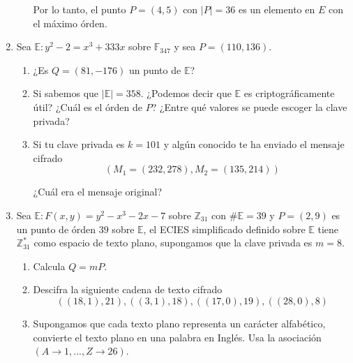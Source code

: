 \documentclass[letterpaper,11pt]{article}
\begin{document}
\begin{enumerate}
\begin{enumerate}
        Por lo tanto, el punto $P = (4, 5)$ con $|P| = 36$ es un
        elemento en $E$ con el máximo órden.
    \end{enumerate}

    \item Sea $\mathbb{E} : y^2 - 2 = x^3 + 333x$ sobre $\mathbb{F}_{347}$ y 
    sea $P = (110, 136)$. 
    \begin{enumerate}
        \item ¿Es $Q = (81, -176)$ un punto de $\mathbb{E}$?
        \item Si sabemos que $|\mathbb{E}| = 358$. ¿Podemos decir que 
        $\mathbb{E}$ es criptográficamente útil? ¿Cuál es el órden de $P$? 
        ¿Entre qué valores se puede escoger la clave privada?
        \item Si tu clave privada es $k = 101$ y algún conocido te ha enviado 
        el mensaje cifrado
        \begin{equation*}
            (M_1 = (232, 278), M_2 = (135, 214))
        \end{equation*}

        ¿Cuál era el mensaje original?
    \end{enumerate}

    \item Sea $\mathbb{E} : F(x, y) = y^2 - x^3 - 2x - 7$ sobre 
    $\mathbb{Z}_{31}$ con $\# \mathbb{E} = 39$ y $P = (2, 9)$ es un punto de 
    órden $39$ sobre $\mathbb{E}$, el \textsc{ECIES} simplificado definido sobre 
    $\mathbb{E}$ tiene $\mathbb{Z}^{*}_{31}$ como espacio de texto plano, 
    supongamos que la clave privada es $m = 8$. 
    \begin{enumerate}
        \item Calcula $Q = mP$.
        \item Descifra la siguiente cadena de texto cifrado 
        \begin{equation*}
            ((18, 1), 21), ((3, 1), 18), ((17, 0), 19), ((28, 0), 8)
        \end{equation*}
        \item Supongamos que cada texto plano representa un carácter alfabético,
        convierte el texto plano en una palabra en Inglés. Usa la asociación 
        $(A \rightarrow 1, ..., Z \rightarrow 26)$.
    \end{enumerate}
\end{enumerate}
\end{document}
